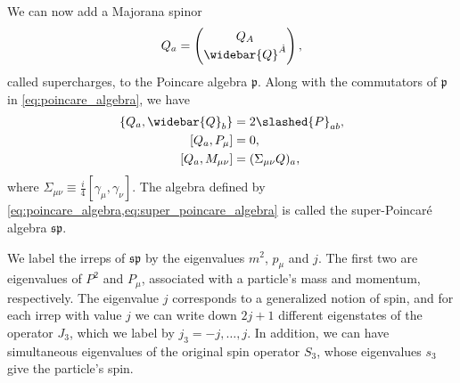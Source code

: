 We can now add a Majorana spinor 
\begin{equation}
    Q_a = \begin{pmatrix}
        Q_A \\ \widebar{Q}^{\dot{A}}
    \end{pmatrix},
\end{equation}
called supercharges, to the Poincare algebra $\mathfrak{p}$.
Along with the commutators of $\mathfrak{p}$ in \cref{eq:poincare_algebra}, we have
\begin{subequations}
\label{eq:super_poincare_algebra}
\begin{align}
    \{Q_a,\widebar{Q}_b\} &= 2\slashed{P}_{ab},
    \\
    [Q_a,P_\mu] &= 0,
    \\
    [Q_a,M_{\mu\nu}] &= (\Sigma_{\mu\nu}Q)_a,
\end{align}
\end{subequations}
where $\Sigma_{\mu\nu} \equiv \frac{i}{4}[\gamma_\mu,\gamma_\nu]$. The algebra defined by \cref{eq:poincare_algebra,eq:super_poincare_algebra} is called the super-Poincar\'e algebra $\mathfrak{sp}$.

We label the \glspl{irrep} of $\mathfrak{sp}$ by the eigenvalues $m^2$, $p_\mu$ and $j$.
The first two are eigenvalues of $P^2$ and $P_\mu$, associated with a particle's mass and momentum, respectively.
The eigenvalue $j$ corresponds to a generalized notion of spin, and for each \gls{irrep} with value $j$ we can write down $2j+1$ different eigenstates of the operator $J_3$, which we label by $j_3=-j,\ldots,j$.
In addition, we can have simultaneous eigenvalues of the original spin operator $S_3$, whose eigenvalues $s_3$ give the particle's spin.


